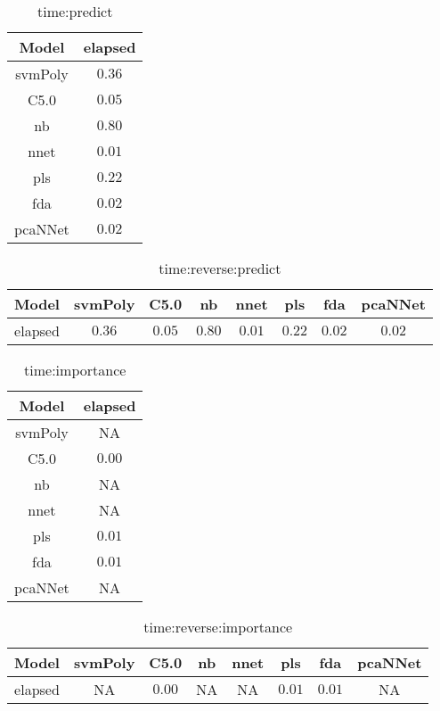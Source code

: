 \begin{table}[!ht]
	\centering
	\begin{tabular}{|c|c|}
		\hline
		Model & elapsed \\ \hline
		svmPoly & $0.36$ \\ \hline
		C5.0 & $0.05$ \\ \hline
		nb & $0.80$ \\ \hline
		nnet & $0.01$ \\ \hline
		pls & $0.22$ \\ \hline
		fda & $0.02$ \\ \hline
		pcaNNet & $0.02$ \\ \hline
	\end{tabular}
	\caption{time:predict}
	\label{tab:time:predict}
\end{table}

\begin{table}[!ht]
	\centering
	\begin{tabular}{|c|c|c|c|c|c|c|c|}
		\hline
		Model & svmPoly & C5.0 & nb & nnet & pls & fda & pcaNNet \\ \hline
		elapsed & $0.36$ & $0.05$ & $0.80$ & $0.01$ & $0.22$ & $0.02$ & $0.02$ \\ \hline
	\end{tabular}
	\caption{time:reverse:predict}
	\label{tab:time:reverse:predict}
\end{table}

\begin{table}[!ht]
	\centering
	\begin{tabular}{|c|c|}
		\hline
		Model & elapsed \\ \hline
		svmPoly & NA \\ \hline
		C5.0 & $0.00$ \\ \hline
		nb & NA \\ \hline
		nnet & NA \\ \hline
		pls & $0.01$ \\ \hline
		fda & $0.01$ \\ \hline
		pcaNNet & NA \\ \hline
	\end{tabular}
	\caption{time:importance}
	\label{tab:time:importance}
\end{table}

\begin{table}[!ht]
	\centering
	\begin{tabular}{|c|c|c|c|c|c|c|c|}
		\hline
		Model & svmPoly & C5.0 & nb & nnet & pls & fda & pcaNNet \\ \hline
		elapsed & NA & $0.00$ & NA & NA & $0.01$ & $0.01$ & NA \\ \hline
	\end{tabular}
	\caption{time:reverse:importance}
	\label{tab:time:reverse:importance}
\end{table}


